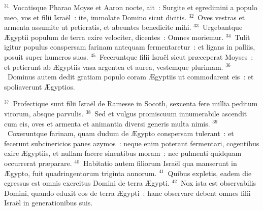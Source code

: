 ${}^{31}$~Vocatisque Pharao Moyse et Aaron nocte, ait~: Surgite et egredimini a populo meo, vos et filii Isra\"el~: ite, immolate Domino sicut dicitis.
${}^{32}$~Oves vestras et armenta assumite ut petieratis, et abeuntes benedicite mihi.
${}^{33}$~Urgebantque \AE gyptii populum de terra exire velociter, dicentes~: Omnes moriemur.
${}^{34}$~Tulit igitur populus conspersam farinam antequam fermentaretur~: et ligans in palliis, posuit super humeros suos.
${}^{35}$~Feceruntque filii Isra\"el sicut pr\ae ceperat Moyses~: et petierunt ab \AE gyptiis vasa argentea et aurea, vestemque plurimam.
${}^{36}$~Dominus autem dedit gratiam populo coram \AE gyptiis ut commodarent eis~: et spoliaverunt \AE gyptios.


${}^{37}$~Profectique sunt filii Isra\"el de Ramesse in Socoth, sexcenta fere millia peditum virorum, absque parvulis.
${}^{38}$~Sed et vulgus promiscuum innumerabile ascendit cum eis, oves et armenta et animantia diversi generis multa nimis.
${}^{39}$~Coxeruntque farinam, quam dudum de \AE gypto conspersam tulerant~: et fecerunt subcinericios panes azymos~: neque enim poterant fermentari, cogentibus exire \AE gyptiis, et nullam facere sinentibus moram~: nec pulmenti quidquam occurrerat pr\ae parare.
${}^{40}$~Habitatio autem filiorum Isra\"el qua manserunt in \AE gypto, fuit quadringentorum triginta annorum.
${}^{41}$~Quibus expletis, eadem die egressus est omnis exercitus Domini de terra \AE gypti.
${}^{42}$~Nox ista est observabilis Domini, quando eduxit eos de terra \AE gypti~: hanc observare debent omnes filii Isra\"el in generationibus suis.


